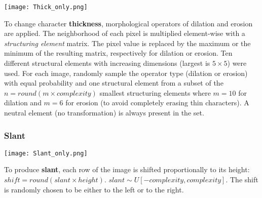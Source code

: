 \documentclass[smallcondensed]{svjour3}     %
\begin{document}
\begin{minipage}[b]{0.14\linewidth}
\begin{center}
\vspace*{-5mm}
\texttt{[image: Thick\_only.png]}\\
\end{center}
\vspace{.6cm}
\end{minipage}%
\hspace{0.3cm}\begin{minipage}[b]{0.86\linewidth}
To change character {\bf thickness}, morphological operators of dilation and erosion~\citep{Haralick87,Serra82}
are applied. The neighborhood of each pixel is multiplied
element-wise with a {\em structuring element} matrix.
The pixel value is replaced by the maximum or the minimum of the resulting
matrix, respectively for dilation or erosion. Ten different structural elements with 
increasing dimensions (largest is $5\times5$) were used.  For each image, 
randomly sample the operator type (dilation or erosion) with equal probability and one structural
element from a subset of the $n=round(m \times complexity)$ smallest structuring elements
where $m=10$ for dilation and $m=6$ for erosion (to avoid completely erasing thin characters).  
A neutral element (no transformation) 
is always present in the set.
\end{minipage}

\vspace{2mm}

\subsubsection*{Slant}
\vspace*{2mm}

\begin{minipage}[b]{0.14\linewidth}
\centering
\texttt{[image: Slant\_only.png]}\\
\end{minipage}%
\hspace{0.3cm}
\begin{minipage}[b]{0.83\linewidth}
To produce {\bf slant}, each row of the image is shifted
proportionally to its height: $shift = round(slant \times height)$.  
$slant \sim U[-complexity,complexity]$.
The shift is randomly chosen to be either to the left or to the right.
\vspace{5mm}
\end{minipage}
\end{document}
